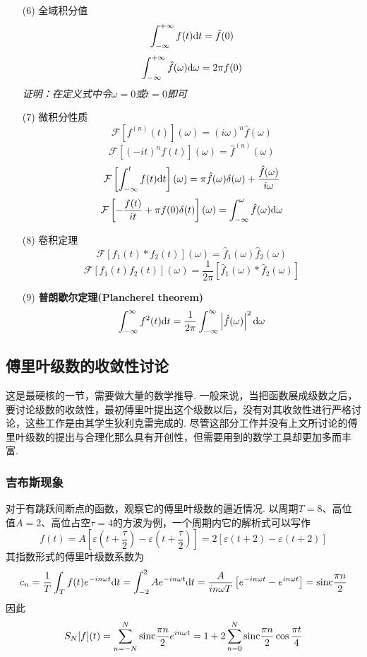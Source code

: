 \documentclass[main.tex]{subfiles}
\begin{document}
\begin{itemize}
    \item [(6)] 全域积分值
    \[ \int_{-\infty}^{+\infty}f(t){\rm d}t = \hat{f}(0)\]
    \[ \int_{-\infty}^{+\infty}\hat{f}(\omega){\rm d}\omega = 2\pi f(0)\]
    \textit{证明：在定义式中令\(\omega=0\)或\(t=0\)即可}
    \item [(7)] 微积分性质
    \[ \mathcal{F}\left[f^{(n)}(t)\right](\omega) = (i\omega)^n \hat{f}(\omega) \]
    \[ \mathcal{F}\left[(-it)^nf(t)\right](\omega) = \hat{f}^{(n)}(\omega)\]
    \[ \mathcal{F}\left[\int_{-\infty}^t f(t){\rm d}t\right](\omega) = \pi \hat{f}(\omega)\delta(\omega)+\frac{\hat{f}(\omega)}{i\omega}\]
    \[ \mathcal{F}\left[-\frac{f(t)}{it}+\pi f(0)\delta(t)\right](\omega) = \int_{-\infty}^\omega \hat{f}(\omega){\rm d}\omega\]
    \item [(8)] 卷积定理
    \[ \mathcal{F}\left[f_1(t)*f_2(t)\right](\omega) = \hat{f}_1(\omega)\hat{f}_2(\omega)\]
    \[ \mathcal{F}\left[f_1(t)f_2(t)\right](\omega) = \frac{1}{2\pi}[\hat{f}_1(\omega) * \hat{f}_2(\omega)]\]
    \item [(9)] \textbf{普朗歇尔定理(Plancherel theorem)}
    \[\int_{-\infty}^{\infty}f^2(t){\rm d}t = \frac{1}{2\pi}\int_{-\infty}^{\infty}\left|\hat{f}(\omega)\right|^2{\rm d}\omega\]
\end{itemize}

\subsection{傅里叶级数的收敛性讨论}

这是最硬核的一节，需要做大量的数学推导. 一般来说，当把函数展成级数之后，要讨论级数的收敛性，最初傅里叶提出这个级数以后，没有对其收敛性进行严格讨论，这些工作是由其学生狄利克雷完成的. 尽管这部分工作并没有上文所讨论的傅里叶级数的提出与合理化那么具有开创性，但需要用到的数学工具却更加多而丰富.

\subsubsection{吉布斯现象}

对于有跳跃间断点的函数，观察它的傅里叶级数的逼近情况. 以周期\(T=8\)、高位值\(A=2\)、高位占空\(\tau=4\)的方波为例，一个周期内它的解析式可以写作
\[f(t)=A\left[\varepsilon\left(t+\frac{\tau}{2}\right)-\varepsilon\left(t+\frac{\tau}{2}\right)\right]=2\left[\varepsilon\left(t+2\right)-\varepsilon\left(t+2\right)\right]\]
其指数形式的傅里叶级数系数为 
\[c_n=\frac{1}{T}\int_{T}f(t)e^{-in\omega t}{\rm d}t=\int_{-2}^{2}Ae^{-in\omega t}{\rm d}t = \frac{A}{in\omega T}\left[e^{-in\omega t}-e^{in\omega t}\right] = {\rm sinc}\frac{\pi n}{2}\]
因此
\[S_N[f](t) = \sum_{n=-N}^{N}{\rm sinc}\frac{\pi n}{2}e^{in\omega t} = 1+2\sum_{n=0}^{N}{\rm sinc}\frac{\pi n}{2}\cos\frac{\pi t}{4}\]
\end{document}

